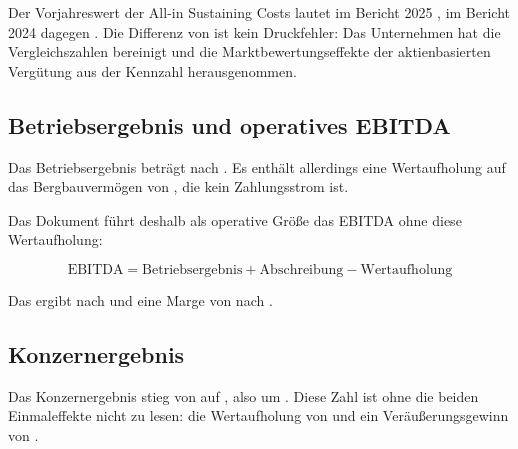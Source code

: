 Der Vorjahreswert der All-in Sustaining Costs lautet im Bericht 2025
\JeUnze{\AISCVJneu}, im Bericht 2024 dagegen
\JeUnze{\AISCXXIV}. Die Differenz von
\JeUnze{\AISCNeuberechnung} ist kein Druckfehler: Das Unternehmen hat die
Vergleichszahlen bereinigt und die Marktbewertungseffekte der
aktienbasierten Verg\"utung aus der Kennzahl herausgenommen.


\subsection{Betriebsergebnis und operatives EBITDA}

Das Betriebsergebnis betr\"agt \MioUSDexakt{\BetriebsErgebnis} nach
\MioUSDexakt{\BetriebsErgebnisVJ}. Es enth\"alt allerdings
eine Wertaufholung auf das Bergbauverm\"ogen von
\MioUSDexakt{\Wertaufholung}, die kein Zahlungsstrom ist.

Das Dokument f\"uhrt deshalb als operative Gr\"o{\ss}e das EBITDA ohne diese
Wertaufholung:

\begin{equation}
\label{eq:ebitda}
\text{EBITDA} = \text{Betriebsergebnis} + \text{Abschreibung} - \text{Wertaufholung}
\end{equation}

Das ergibt \MioUSDexakt{\EBITDA} nach \MioUSDexakt{\EBITDAVJ} und eine Marge
von \Pct{\EBITDAMarge} nach \Pct{\EBITDAMargeVJ}.

\subsection{Konzernergebnis}

Das Konzernergebnis stieg von \MioUSDexakt{\KonzernergebnisVJ} auf
\MioUSDexakt{\Konzernergebnis}, also um \Pct{\ErgebnisDelta}.
Diese Zahl ist ohne die beiden Einmaleffekte nicht zu lesen: die
Wertaufholung von \MioUSDexakt{\Wertaufholung} und ein
Ver\"au{\ss}erungsgewinn von \MioUSDexakt{\VeraeusserungsGewinn}.

